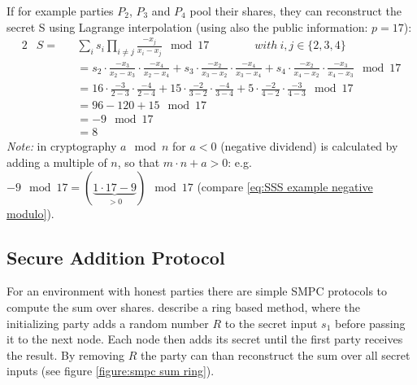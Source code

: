 		 If for example parties $P_2$, $P_3$ and $P_4$ pool their shares, they can reconstruct the secret S using Lagrange interpolation (using also the public information: $p=17$):
		 \begin{alignat}{2}
		 & S = && \sum_i s_i \prod_{i \neq j} \frac{-x_j}{x_i - x_j } \mod 17 \qquad \qquad  with \ i,j \in \{2,3,4\} \\
		 & \quad && =s_2 \cdot \frac{-x_3}{x_2-x_3} \cdot \frac{-x_4}{x_2-x_4} + s_3 \cdot \frac{-x_2}{x_3-x_2} \cdot \frac{-x_4}{x_3-x_4} + s_4 \cdot \frac{-x_2}{x_4-x_2} \cdot \frac{-x_3}{x_4-x_3} \mod 17 \nonumber \\
		 & \quad && =16 \cdot \frac{-3}{2-3} \cdot \frac{-4}{2-4} + 15 \cdot \frac{-2}{3-2} \cdot \frac{-4}{3-4} + 5 \cdot \frac{-2}{4-2} \cdot \frac{-3}{4-3} \mod 17  \nonumber \\
		 & \quad && = 96-120+15 \mod 17 \nonumber \\
		 & \quad && = -9 \mod 17 \label{eq:SSS example negative modulo} \\
		 & \quad && = 8 \nonumber 
		 \end{alignat}
		 \textit{Note:} in cryptography $a \mod n$ for $a<0$ (negative dividend) is calculated by adding a multiple of  $n$, so that $m \cdot n+a>0$: e.g. $-9 \mod 17 = (\underbrace{1 \cdot 17-9}_{>0}) \mod 17$ (compare \ref{eq:SSS example negative modulo}).
		 
		
		\subsection{Secure Addition Protocol}
		\label{Secure Addition Protocol}
		
		For an environment with honest parties there are simple \gls{SMPC} protocols to compute the sum over shares. \textcite{Clifton2002} describe a ring based method, where the initializing party adds a random number $R$ to the secret input $s_1$ before passing it to the next node. Each node then adds its secret until the first party receives the result. By removing $R$ the party can than reconstruct the sum over all secret inputs (see figure \ref{figure:smpc sum ring}).
		
